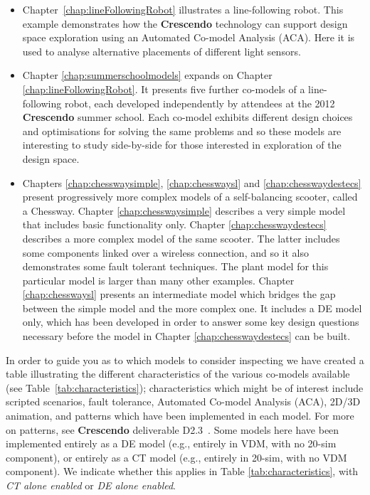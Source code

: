 \documentclass{crescendorepchap}
\newcommand{\DESTECS}{\textbf{Crescendo}\xspace}
\begin{document}
\begin{itemize}
\item Chapter~\ref{chap:lineFollowingRobot} illustrates a
  line-following robot. This example demonstrates how the \DESTECS
  technology can support design space exploration using an Automated
  Co-model Analysis (ACA). Here it is used to analyse alternative
  placements of different light sensors.
\item Chapter \ref{chap:summerschoolmodels} expands on Chapter
  \ref{chap:lineFollowingRobot}.  It presents five further co-models
  of a line-following robot, each developed independently by attendees
  at the 2012 \DESTECS summer school.  Each co-model exhibits different
  design choices and optimisations for solving the same problems and
  so these models are interesting to study side-by-side for those
  interested in exploration of the design space.
\item Chapters \ref{chap:chesswaysimple}, \ref{chap:chesswaysl} and
  \ref{chap:chesswaydestecs} present progressively more complex models
  of a self-balancing scooter, called a Chessway.  Chapter
  \ref{chap:chesswaysimple} describes a very simple model that
  includes basic functionality only.  Chapter
  \ref{chap:chesswaydestecs} describes a more complex model of the
  same scooter.  The latter includes some components linked over a
  wireless connection, and so it also demonstrates some fault tolerant
  techniques.  The plant model for this particular model is larger
  than many other examples.  Chapter \ref{chap:chesswaysl} presents an
  intermediate model which bridges the gap between the simple model
  and the more complex one. It includes a DE model only, which has
  been developed in order to answer some key design questions
  necessary before the model in Chapter \ref{chap:chesswaydestecs} can
  be built.
\end{itemize}

In order to guide you as to which models to consider inspecting we
have created a table illustrating the different characteristics of the
various co-models available (see Table~\ref{tab:characteristics});
characteristics which might be of interest include scripted scenarios,
fault tolerance, Automated Co-model Analysis (ACA), 2D/3D animation,
and patterns which have been implemented in each model.  For more on
patterns, see \DESTECS deliverable D2.3~\cite{DESTECSD23}.  Some models here have been implemented entirely as a DE model (e.g., entirely in VDM, with no 20-sim component), or entirely as a CT model (e.g., entirely in 20-sim, with no VDM component).  We indicate whether this applies in Table \ref{tab:characteristics}, with \emph{CT alone enabled} or \emph{DE alone enabled}.
\end{document}
